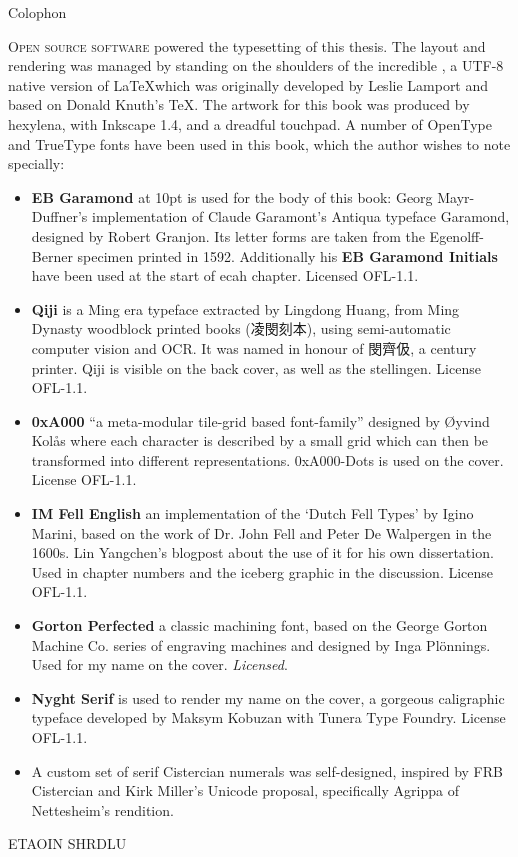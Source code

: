 \pagestyle{empty}


\begin{center}
	{\color{hexy-red}\large  Colophon}
\end{center}
\begin{center}
	\parbox{300pt}{%
	\vspace{1em}
	\small
	\lettrine[lines=3,lraise=-0.1,lhang=0.3,findent=0.5em,nindent=0em]{\textcolor{hexy-red}{\fontEBGaramondInitials{}O}}{pen source software} powered the typesetting of this thesis. The layout and rendering was managed by standing on the shoulders of the incredible \XeLaTeX, a UTF-8 native version of \LaTeX which was originally developed by Leslie Lamport and based on Donald Knuth's \TeX. The artwork for this book was produced by hexylena, with Inkscape 1.4, and a dreadful touchpad. A number of OpenType and TrueType fonts have been used in this book, which the author wishes to note specially:
	\begin{itemize}
		\item \textbf{EB Garamond} at 10pt is used for the body of this book: Georg Mayr-Duffner's implementation of Claude Garamont's Antiqua typeface Garamond, designed by Robert Granjon. Its letter forms are taken from the Egenolff-Berner specimen printed in 1592. Additionally his \textbf{EB Garamond Initials} have been used at the start of ecah chapter. Licensed OFL-1.1.
		\item \textbf{Qiji} is a Ming era typeface extracted by Lingdong Huang, from Ming Dynasty woodblock printed books ({\fontQiji{}凌閔刻本}), using semi-automatic computer vision and OCR. It was named in honour of {\fontQiji{}閔齊伋}, a  century printer. Qiji is visible on the back cover, as well as the stellingen. License OFL-1.1.
		\item \textbf{0xA000} ``a meta-modular tile-grid based font-family'' designed by Øyvind Kolås where each character is described by a small grid which can then be transformed into different representations. 0xA000-Dots is used on the cover. License OFL-1.1.
		\item \textbf{IM Fell English} an implementation of the `Dutch Fell Types' by Igino Marini, based on the work of Dr. John Fell and Peter De Walpergen in the 1600s. Lin Yangchen's blogpost about the use of it for his own dissertation. Used in chapter numbers and the iceberg graphic in the discussion. License OFL-1.1.
		\item \textbf{Gorton Perfected} a classic machining font, based on the George Gorton Machine Co. series of engraving machines and designed by Inga Plönnings. Used for my name on the cover. \emph{Licensed}.
		\item \textbf{Nyght Serif} is used to render my name on the cover, a gorgeous caligraphic typeface developed by Maksym Kobuzan with Tunera Type Foundry. License OFL-1.1.
		\item A custom set of serif Cistercian numerals was self-designed, inspired by FRB Cistercian and Kirk Miller's Unicode proposal, specifically Agrippa of Nettesheim's rendition.
	\end{itemize}
}
\vfill
ETAOIN SHRDLU
\end{center}
